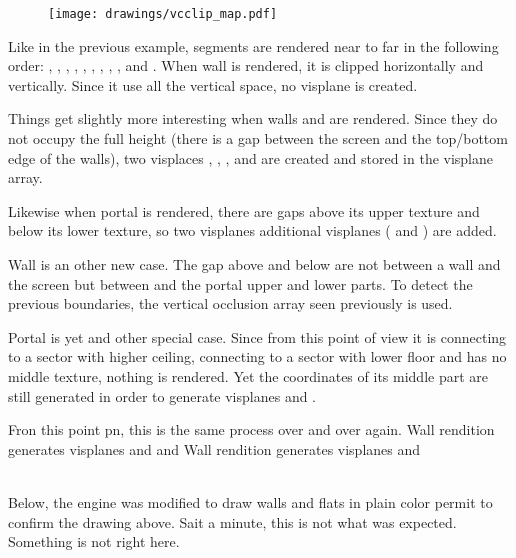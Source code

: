 \begin{figure}
\centering
\texttt{[image: drawings/vcclip\_map.pdf]}
\end{figure}
Like in the previous example, segments are rendered near to far in the following order: , , , , , , , , , and .
When wall  is rendered, it is clipped horizontally and vertically. Since it use all the vertical space, no visplane is created.\\
\par
 Things get slightly more interesting when walls  and  are rendered. Since they do not occupy the full height (there is a gap between the screen and the top/bottom edge of the walls), two visplaces , , , and  are created and stored in the visplane array.\\
 \par
  Likewise when portal  is rendered, there are gaps above its upper texture and below its lower texture, so two visplanes additional visplanes ( and ) are added.\\
\par
Wall  is an other new case. The gap above and below are not between a wall and the screen but between   and the portal  upper and lower parts. To detect the previous boundaries, the vertical occlusion array seen previously is used.\\
\par
Portal  is yet and other special case. Since from this point of view it is connecting to a sector with higher ceiling, connecting to a sector with lower floor and has no middle texture, nothing is rendered. Yet the coordinates of its middle part are still generated in order to generate visplanes  and  .\\
\par
Fron this point pn, this is the same process over and over again. Wall  rendition generates visplanes  and   and Wall  rendition generates visplanes  and  
\pagebreak








\\
Below, the engine was modified to draw walls and flats in plain color permit to confirm the drawing above. Sait a minute, this is not what was expected. Something is not right here.\\  
\par
{}




